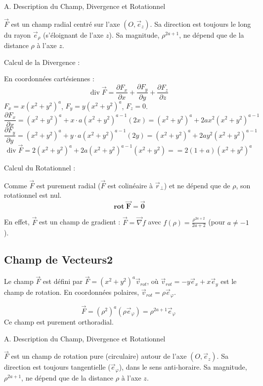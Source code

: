\documentclass[french]{yLectureNote}
\renewcommand{\vec}{\overrightarrow}
\begin{document}
A. Description du Champ, Divergence et Rotationnel

$\vec{F}$ est un champ radial centré sur l'axe $(O, \vec{e}_z)$. Sa direction est toujours le long du rayon $\vec{e}_{\rho}$ (s'éloignant de l'axe $z$). Sa magnitude, $\rho^{2a+1}$, ne dépend que de la distance $\rho$ à l'axe $z$.

Calcul de la Divergence :

    En coordonnées cartésiennes :
    $$
    \operatorname{div}\vec{F} = \frac{\partial F_x}{\partial x} + \frac{\partial F_y}{\partial y} + \frac{\partial F_z}{\partial z}
    $$
    $F_x = x(x^2+y^2)^a$, $F_y = y(x^2+y^2)^a$, $F_z = 0$.
    $$
    \frac{\partial F_x}{\partial x} = (x^2+y^2)^a + x \cdot a(x^2+y^2)^{a-1}(2x) = (x^2+y^2)^a + 2ax^2(x^2+y^2)^{a-1}
    $$
    $$
    \frac{\partial F_y}{\partial y} = (x^2+y^2)^a + y \cdot a(x^2+y^2)^{a-1}(2y) = (x^2+y^2)^a + 2ay^2(x^2+y^2)^{a-1}
    $$
    $$
    \operatorname{div}\vec{F} = 2(x^2+y^2)^a + 2a(x^2+y^2)^{a-1}(x^2+y^2) = = 2(1+a)(x^2+y^2)^a
    $$

Calcul du Rotationnel :

    Comme $\vec{F}$ est purement radial ($\vec{F}$ est colinéaire à $\vec{r}_{\perp}$) et ne dépend que de $\rho$, son rotationnel est nul.
    $$
    \mathbf{\operatorname{rot}\vec{F} = \vec{0}}
    $$

    En effet, $\vec{F}$ est un champ de gradient : $\vec{F} = \vec{\nabla}f$ avec $f(\rho) = \frac{\rho^{2a+2}}{2a+2}$ (pour $a \ne -1$).


\subsection{Champ de Vecteurs2}

Le champ $\vec{F}$ est défini par $\vec{F} = (x^2+y^2)^a \vec{v}_{rot}$, où $\vec{v}_{rot} = -y\vec{e}_{x}+x\vec{e}_{y}$ est le champ de rotation. En coordonnées polaires, $\vec{v}_{rot} = \rho \vec{e}_{\varphi}$.

$$
\vec{F} = (\rho^2)^a (\rho \vec{e}_{\varphi}) = \rho^{2a+1} \vec{e}_{\varphi}
$$
Ce champ est purement orthoradial.

A. Description du Champ, Divergence et Rotationnel

$\vec{F}$ est un champ de rotation pure (circulaire) autour de l'axe $(O, \vec{e}_z)$. Sa direction est toujours tangentielle ($\vec{e}_{\varphi}$), dans le sens anti-horaire. Sa magnitude, $\rho^{2a+1}$, ne dépend que de la distance $\rho$ à l'axe $z$.
\end{document}
